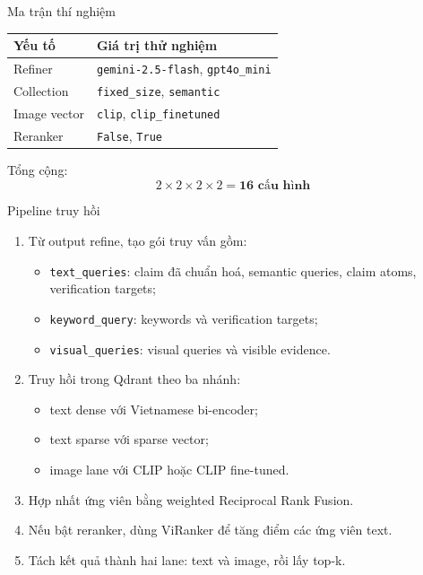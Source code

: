 \documentclass[aspectratio=169]{beamer}
\begin{document}
\begin{frame}{Ma trận thí nghiệm}
  \begin{table}
    \centering
    \small
    \begin{tabular}{ll}
      \toprule
      Yếu tố & Giá trị thử nghiệm \\
      \midrule
      Refiner & \texttt{gemini-2.5-flash}, \texttt{gpt4o\_mini} \\
      Collection & \texttt{fixed\_size}, \texttt{semantic} \\
      Image vector & \texttt{clip}, \texttt{clip\_finetuned} \\
      Reranker & \texttt{False}, \texttt{True} \\
      \bottomrule
    \end{tabular}
  \end{table}

  \vspace{0.3cm}
  Tổng cộng:
  \[
    2 \times 2 \times 2 \times 2 = \textbf{16 cấu hình}
  \]
\end{frame}

\begin{frame}{Pipeline truy hồi}
  \begin{enumerate}
    \item Từ output refine, tạo gói truy vấn gồm:
    \begin{itemize}
      \item \texttt{text\_queries}: claim đã chuẩn hoá, semantic queries, claim atoms, verification targets;
      \item \texttt{keyword\_query}: keywords và verification targets;
      \item \texttt{visual\_queries}: visual queries và visible evidence.
    \end{itemize}
    \item Truy hồi trong Qdrant theo ba nhánh:
    \begin{itemize}
      \item text dense với Vietnamese bi-encoder;
      \item text sparse với sparse vector;
      \item image lane với CLIP hoặc CLIP fine-tuned.
    \end{itemize}
    \item Hợp nhất ứng viên bằng weighted Reciprocal Rank Fusion.
    \item Nếu bật reranker, dùng ViRanker để tăng điểm các ứng viên text.
    \item Tách kết quả thành hai lane: text và image, rồi lấy top-k.
  \end{enumerate}
\end{frame}
\end{document}
